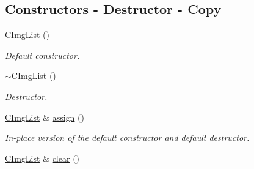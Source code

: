 \subsection*{Constructors -\/ Destructor -\/ Copy}
\label{_amgrp21f19e3edc67f557111253c632cf5108}
 \begin{DoxyCompactItemize}
\item 
\hypertarget{structcimg__library_1_1_c_img_list_a2d39db2f68af51153f623c43afc655a1}{
\hyperlink{structcimg__library_1_1_c_img_list_a2d39db2f68af51153f623c43afc655a1}{CImgList} ()}
\label{structcimg__library_1_1_c_img_list_a2d39db2f68af51153f623c43afc655a1}

\begin{DoxyCompactList}\small\item\em Default constructor. \item\end{DoxyCompactList}\item 
\hypertarget{structcimg__library_1_1_c_img_list_a2bb17b7eec1c4b6eaddbb0e2af211dbb}{
\hyperlink{structcimg__library_1_1_c_img_list_a2bb17b7eec1c4b6eaddbb0e2af211dbb}{$\sim$CImgList} ()}
\label{structcimg__library_1_1_c_img_list_a2bb17b7eec1c4b6eaddbb0e2af211dbb}

\begin{DoxyCompactList}\small\item\em Destructor. \item\end{DoxyCompactList}\item 
\hypertarget{structcimg__library_1_1_c_img_list_a8531064785b0de93f45d78a42c919765}{
\hyperlink{structcimg__library_1_1_c_img_list}{CImgList} \& \hyperlink{structcimg__library_1_1_c_img_list_a8531064785b0de93f45d78a42c919765}{assign} ()}
\label{structcimg__library_1_1_c_img_list_a8531064785b0de93f45d78a42c919765}

\begin{DoxyCompactList}\small\item\em In-\/place version of the default constructor and default destructor. \item\end{DoxyCompactList}\item 
\hypertarget{structcimg__library_1_1_c_img_list_a96954dbde6c6fa7779d6979fb7b253ed}{
\hyperlink{structcimg__library_1_1_c_img_list}{CImgList} \& \hyperlink{structcimg__library_1_1_c_img_list_a96954dbde6c6fa7779d6979fb7b253ed}{clear} ()}
\label{structcimg__library_1_1_c_img_list_a96954dbde6c6fa7779d6979fb7b253ed}


\end{DoxyCompactItemize}

